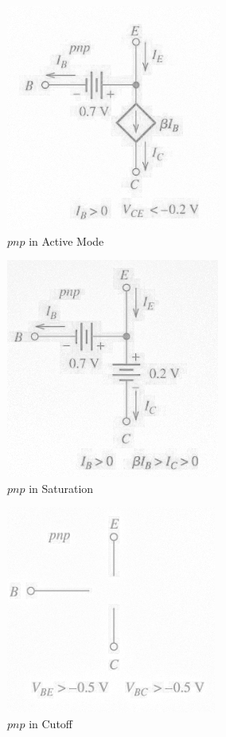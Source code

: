 \documentclass[12pt]{article}
\begin{document}
  \begin{multicols}{3}

    \begin{figure}[H]
      \centering
      \includegraphics[width=.3\textwidth]{Figures/pnpActive}
      \vspace{-10pt}
      \caption{$pnp$ in Active Mode}
      \label{fig:4}
    \end{figure}

    \begin{figure}[H]
      \centering
      \includegraphics[width=.3\textwidth]{Figures/pnpSat}
      \caption{$pnp$ in Saturation}
      \label{fig:5}
    \end{figure}

    \begin{figure}[H]
      \centering
      \includegraphics[width=.3\textwidth]{Figures/pnpCut}
      \caption{$pnp$ in Cutoff}
      \label{fig:6}
    \end{figure}

  \end{multicols}

  \newpage
\end{document}
